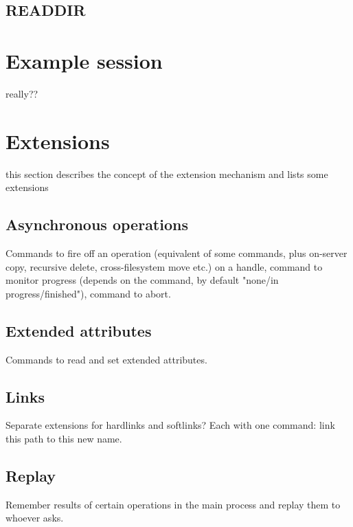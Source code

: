 \subsection{READDIR}



\section{Example session}

really??


\section{Extensions}

this section describes the concept of the extension mechanism and lists some extensions

\subsection{Asynchronous operations}

Commands to fire off an operation (equivalent of some commands, plus on-server copy, recursive delete,
cross-filesystem move etc.) on a handle, command to monitor progress (depends on the command, by default
"none/in progress/finished"), command to abort.

\subsection{Extended attributes}

Commands to read and set extended attributes.

\subsection{Links}

Separate extensions for hardlinks and softlinks? Each with one command: link this path to this new name.

\subsection{Replay}

Remember results of certain operations in the main process and replay them to whoever asks.
